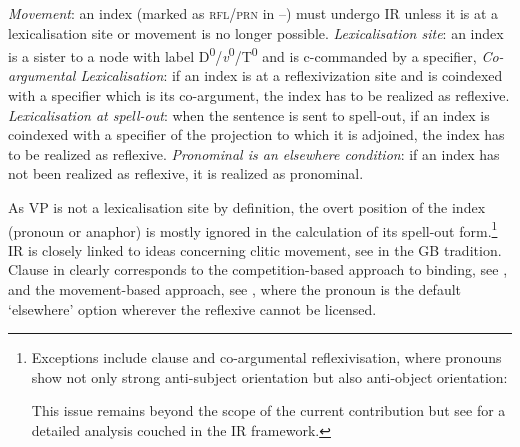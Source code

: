 \documentclass[output=paper,modfonts,nonflat
]{langsci/langscibook}
\begin{document}
\ea\label{ex:witkos:8}
\ea\label{ex:witkos:8a} \textit{Movement}: an index (marked as \textsc{rfl/prn} in --) must undergo IR unless it is at a lexicalisation site or movement is no longer possible.
\ex \label{ex:witkos:8b} \textit{Lexicalisation site}: an index is a sister to a node with label D\textsuperscript{0}/\textit{v}\textsuperscript{0}/T\textsuperscript{0} and is c-commanded by a specifier,
\ex \label{ex:witkos:8c} \textit{Co-argumental Lexicalisation}: if an index is at a reflexivization site and is coindexed with a specifier which is its co-argument, the index has to be realized as reflexive.
\ex \label{ex:witkos:8d} \textit{Lexicalisation at spell-out}: when the sentence is sent to spell-out, if an index is coindexed with a specifier of the projection to which it is adjoined, the index has to 	be realized as reflexive.
\ex \label{ex:witkos:8e} \textit{Pronominal is an elsewhere condition}: if an index has not been realized as reflexive, it is realized as pronominal.
\z\z

\largerpage
\noindent As VP is not a lexicalisation site by definition, the overt position of the index (pronoun or anaphor) is mostly ignored in the calculation of its spell-out form.\footnote{\label{fn12}Exceptions include clause  and co-argumental reflexivisation, where pronouns show not only strong anti-subject orientation but also anti-object orientation: 

\ea
{}
\z
\z
        
\noindent This issue remains beyond the scope of the current contribution but see \cite{goglozaetal_toappear} for a detailed analysis couched in the IR framework.} IR is closely linked to ideas concerning clitic movement, see \cite{sportiche1996,kayne1985,kayne1991,roberts1992,roberts1993} in the GB tradition. Clause in  clearly corresponds to the competition-based approach to binding, see \cite{safir2004}, and the movement-based approach, see \citep{hornstein2001,boeckxetal2008}, where the pronoun is the default ‘elsewhere’ option wherever the reflexive cannot be licensed.
\end{document}
